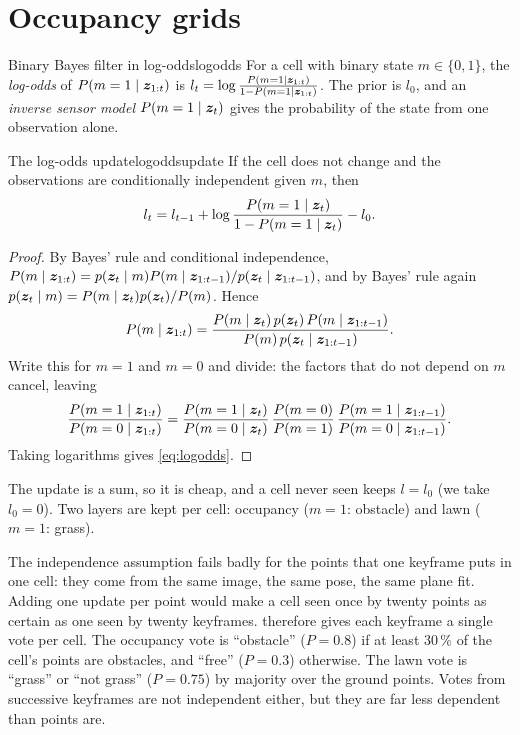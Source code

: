 \section{Occupancy grids}

\begin{definition}{Binary Bayes filter in log-odds}{logodds}
For a cell with binary state $m\in\{0,1\}$, the \emph{log-odds} of
$P(m=1\mid\bm{z}_{1:t})$ is $l_t=\log\frac{P(m=1\mid\bm{z}_{1:t})}
{1-P(m=1\mid\bm{z}_{1:t})}$. The prior is $l_0$, and an \emph{inverse
sensor model} $P(m=1\mid\bm{z}_t)$ gives the probability of the state
from one observation alone.
\end{definition}

\begin{proposition}{The log-odds update}{logoddsupdate}
If the cell does not change and the observations are conditionally
independent given $m$, then
\begin{equation}\label{eq:logodds}
l_t=l_{t-1}+\log\frac{P(m=1\mid\bm{z}_t)}{1-P(m=1\mid\bm{z}_t)}-l_0 .
\end{equation}
\end{proposition}

\begin{proof}
By Bayes' rule and conditional independence,
$P(m\mid\bm{z}_{1:t})=p(\bm{z}_t\mid m)P(m\mid\bm{z}_{1:t-1})/p(\bm{z}_t\mid
\bm{z}_{1:t-1})$, and by Bayes' rule again $p(\bm{z}_t\mid m)=P(m\mid\bm{z}_t)
p(\bm{z}_t)/P(m)$. Hence
\[
P(m\mid\bm{z}_{1:t})=\frac{P(m\mid\bm{z}_t)\,p(\bm{z}_t)\,P(m\mid\bm{z}_{1:t-1})}
{P(m)\,p(\bm{z}_t\mid\bm{z}_{1:t-1})}.
\]
Write this for $m=1$ and $m=0$ and divide: the factors that do not depend
on $m$ cancel, leaving
\[
\frac{P(m=1\mid\bm{z}_{1:t})}{P(m=0\mid\bm{z}_{1:t})}=
\frac{P(m=1\mid\bm{z}_t)}{P(m=0\mid\bm{z}_t)}\,
\frac{P(m=0)}{P(m=1)}\,
\frac{P(m=1\mid\bm{z}_{1:t-1})}{P(m=0\mid\bm{z}_{1:t-1})}.
\]
Taking logarithms gives \eqref{eq:logodds}.
\end{proof}

The update is a sum, so it is cheap, and a cell never seen keeps
$l=l_0$ (we take $l_0=0$). Two layers are kept per cell: occupancy
($m=1$: obstacle) and lawn ($m=1$: grass).

The independence assumption fails badly for the points that one
keyframe puts in one cell: they come from the same image, the same
pose, the same plane fit. Adding one update per point would make a cell
seen once by twenty points as certain as one seen by twenty keyframes.
 therefore gives each keyframe a single vote
per cell. The occupancy vote is ``obstacle'' ($P=0.8$) if at least
30\,\% of the cell's points are obstacles, and ``free'' ($P=0.3$)
otherwise. The lawn vote is ``grass'' or ``not grass'' ($P=0.75$) by
majority over the ground points. Votes from successive keyframes are
not independent either, but they are far less dependent than points
are.

